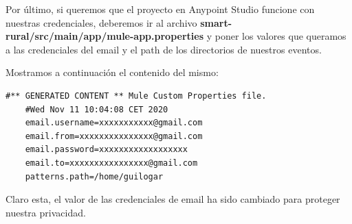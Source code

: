 \documentclass[a4paper,12pt]{article}
\begin{document}
Por último, si queremos que el proyecto en Anypoint Studio funcione con nuestras credenciales, deberemos ir
al archivo \textbf{smart-rural/src/main/app/mule-app.properties} y poner los valores que queramos a las credenciales
del email y el path de los directorios de nuestros eventos.

Mostramos a continuación el contenido del mismo:

\begin{lstlisting}[language=xml,caption=mule-app.properties]
    #** GENERATED CONTENT ** Mule Custom Properties file.
    #Wed Nov 11 10:04:08 CET 2020
    email.username=xxxxxxxxxxx@gmail.com
    email.from=xxxxxxxxxxxxxxx@gmail.com
    email.password=xxxxxxxxxxxxxxxxxx
    email.to=xxxxxxxxxxxxxxxx@gmail.com
    patterns.path=/home/guilogar
\end{lstlisting}

Claro esta, el valor de las credenciales de email ha sido cambiado para proteger nuestra privacidad.

\clearpage

\nocite{*}


\end{document}
